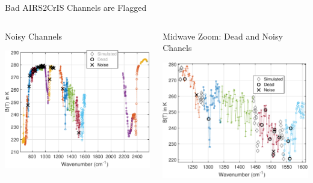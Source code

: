 \documentclass[10pt,t]{beamer}
\begin{document}
\begin{frame}[label={sec:org7dc76f6}]{Bad AIRS2CrIS Channels are Flagged}
\vspace{-0.25in}

\begin{columns}
\begin{column}{0.55\columnwidth}
\begin{block}{\footnotesize Noisy Channels}
\vspace{-0.05in}
\vspace{-0.05in}
\begin{center}
\includegraphics[width=0.77\linewidth]{./Figs/Pdf/a2c_full_show_noise.pdf}
\end{center}
\end{block}
\end{column}

\begin{column}{0.55\columnwidth}
\begin{block}{\footnotesize Midwave Zoom: Dead and Noisy Chanels}
\vspace{-0.05in}
\vspace{-0.05in}
\begin{center}
\includegraphics[width=0.77\linewidth]{./Figs/Pdf/a2c_full_show_dead_noise_water.pdf}
\end{center}
\end{block}
\end{column}
\end{columns}
\end{frame}
\end{document}
